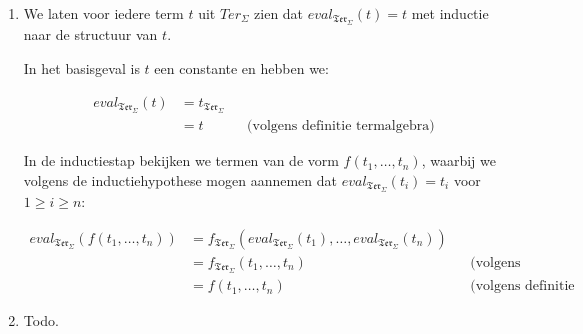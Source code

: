 \documentclass[a4paper,11pt]{article}
\begin{document}
\begin{enumerate}

\item %

We laten voor iedere term $t$ uit $Ter_{\Sigma}$ zien dat
$eval_{\mathfrak{Ter}_{\Sigma}}(t) = t$ met inductie naar de structuur van
$t$.

In het basisgeval is $t$ een constante en hebben we:

\begin{align*}
eval_{\mathfrak{Ter}_{\Sigma}}(t) &= t_{\mathfrak{Ter}_{\Sigma}} \\
                                  &= t &&\text{(volgens definitie termalgebra)}
\end{align*}

In de inductiestap bekijken we termen van de vorm $f(t_{1}, \ldots, t_{n})$,
waarbij we volgens de inductiehypothese mogen aannemen dat
$eval_{\mathfrak{Ter}_{\Sigma}}(t_{i}) = t_{i}$ voor $1 \ge i \ge n$:

\begin{align*}
eval_{\mathfrak{Ter}_{\Sigma}}(f(t_{1}, \ldots, t_{n})) &=
f_{\mathfrak{Ter}_{\Sigma}}(eval_{\mathfrak{Ter}_{\Sigma}}(t_{1}), \ldots,
eval_{\mathfrak{Ter}_{\Sigma}}(t_{n})) \\
    &= f_{\mathfrak{Ter}_{\Sigma}}(t_{1}, \ldots, t_{n}) &&\text{(volgens inductiehypothese)} \\
    &= f(t_{1}, \ldots, t_{n}) &&\text{(volgens definitie termalgebra)}
\end{align*}

\item %





Todo.\\[2em]

\end{enumerate}
\end{document}
